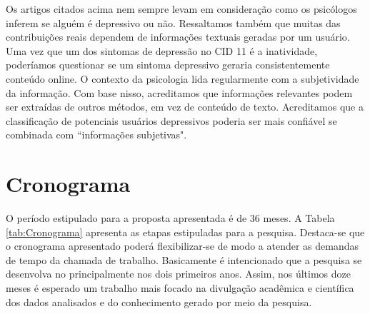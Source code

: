 \documentclass[11pt, notitlepage]{article} %
\begin{document}
Os artigos citados acima nem sempre levam em consideração como os psicólogos inferem se alguém é depressivo ou não.
Ressaltamos também que muitas das contribuições reais dependem de informações textuais geradas por um usuário. Uma vez que um dos sintomas de depressão no CID 11 é a inatividade, poderíamos questionar se um sintoma depressivo geraria consistentemente conteúdo online. O contexto da psicologia lida regularmente com a subjetividade da informação. Com base nisso, acreditamos que informações relevantes podem ser extraídas de outros métodos, em vez de conteúdo de texto. Acreditamos que a classificação de potenciais usuários depressivos poderia ser mais confiável se combinada com ``informações subjetivas".

\newpage
\section*{Cronograma}
O período estipulado para a proposta apresentada é de 36 meses. A Tabela \ref{tab:Cronograma} apresenta as etapas estipuladas para a pesquisa. Destaca-se que o cronograma apresentado poderá flexibilizar-se de modo a atender as demandas de tempo da chamada de trabalho. Basicamente é intencionado que a pesquisa se desenvolva no principalmente nos dois primeiros anos. Assim, nos últimos doze meses é esperado um trabalho mais focado na divulgação acadêmica e científica dos dados analisados e do conhecimento gerado por meio da pesquisa.
\end{document}
